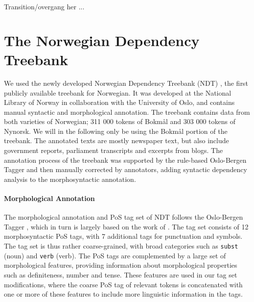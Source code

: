 \documentclass[11pt,a4paper]{article}
\begin{document}
Transition/overgang her ...

\section{The Norwegian Dependency Treebank}
\label{sec:data}
We used the newly developed Norwegian Dependency Treebank (NDT)
\cite{Sol:Skj:Ovr:14}, the first publicly available treebank for
Norwegian. It was developed at the National Library of Norway in
collaboration with the University of Oslo, and contains manual
syntactic and morphological annotation.  The treebank contains data
from both varieties of Norwegian; 311 000 tokens of Bokmål and 303 000
tokens of Nynorsk. We will in the following only be using the Bokmål
portion of the treebank. The annotated texts are mostly newspaper
text, but also include government reports, parliament transcripts and
excerpts from blogs. The annotation process of the treebank was supported by
the rule-based Oslo-Bergen Tagger \cite{Hag:Joh:Nok:00} and then manually
corrected by annotators, adding syntactic dependency analysis to the
morphosyntactic annotation.

\paragraph{Morphological Annotation}
The morphological annotation and PoS tag set of NDT follows the Oslo-Bergen
Tagger \cite{Hag:Joh:Nok:00,Sol:13}, which in turn is largely based on the work
of . The tag set consists of 12 morphosyntactic PoS
tags, with 7 additional tags for punctuation and symbols. The tag set is thus
rather coarse-grained, with broad categories such as \texttt{subst} (noun) and
\texttt{verb} (verb). The PoS tags are complemented by a large set of
morphological features, providing information about morphological properties such as
definiteness, number and tense. These features are used in our tag set
modifications, where the coarse PoS tag of relevant tokens is concatenated with
one or more of these features to include more linguistic information in the
tags.
\end{document}
